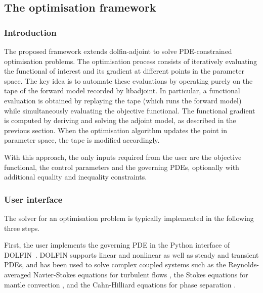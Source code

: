 \documentclass[prodmode,acmtoms]{acmsmall}
\newcommand{\dolfin}{{\mbox{DOLFIN}}\xspace}
\newcommand{\da}{\mbox{{dolfin-adjoint}}\xspace}
\newcommand{\libadjoint}{\mbox{{libadjoint}}\xspace}
\begin{document}
\subsection{The optimisation framework}\label{sec:opt_user_interface}
\subsubsection{Introduction}

The proposed framework extends \da to solve PDE-constrained optimisation problems. 
The optimisation process consists of iteratively evaluating the functional of interest and its gradient at different points in the parameter space. 
The key idea is to automate these evaluations by operating purely on the tape of the forward model recorded by \libadjoint. 
In particular, a functional evaluation is obtained by replaying the tape (which runs the forward model) while simultaneously evaluating the objective functional. 
The functional gradient is computed by deriving and solving the adjoint model, as described in the previous section. 
When the optimisation algorithm updates the point in parameter space, the tape is modified accordingly. 

With this approach, the only inputs required from the user are the objective functional, the control parameters and the governing PDEs,
optionally with additional equality and inequality constraints.

\subsubsection{User interface}
The solver for an optimisation problem is typically implemented in the following three steps.

First, the user implements the governing PDE in the Python interface of \dolfin~\cite{logg2011}.
\dolfin supports linear and nonlinear as well as steady and transient PDEs, and has been used to solve complex coupled systems such
as the Reynolds-averaged Navier-Stokes equations for turbulent flows \cite{mortensen2011}, the Stokes equations for mantle convection \cite{vynnytska2013}, and
the Cahn-Hilliard equations for phase separation \cite{wells2006}.
\end{document}
